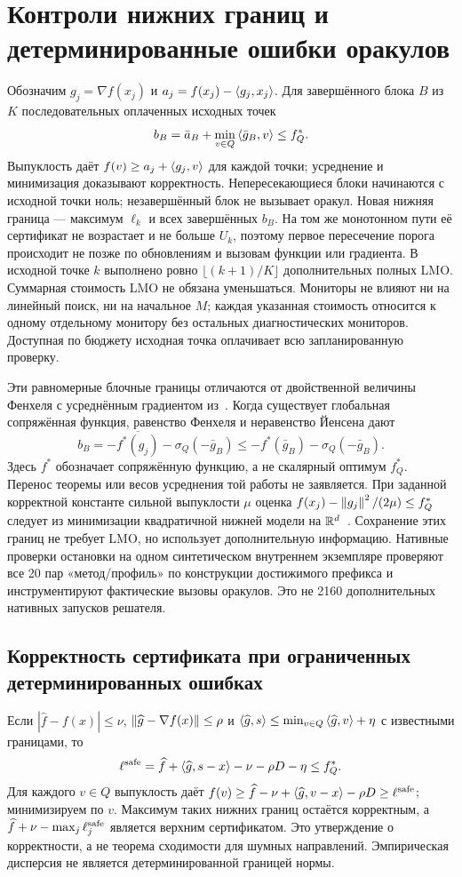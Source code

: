 \section{Контроли нижних границ и детерминированные ошибки оракулов}
\label{app:monitors}
Обозначим $g_j=\nabla f(x_j)$ и $a_j=f(x_j)-\left\langle g_j,x_j\right\rangle$.
Для завершённого блока $B$ из $K$ последовательных оплаченных
исходных точек
\[
 b_B=\bar a_B+\min_{v\in Q}\left\langle\bar g_B,v\right\rangle\le f_Q^*.
\]
Выпуклость даёт $f(v)\ge a_j+\left\langle g_j,v\right\rangle$ для каждой точки;
усреднение и минимизация доказывают корректность.
Непересекающиеся блоки начинаются с исходной точки ноль;
незавершённый блок не вызывает оракул. Новая нижняя граница —
максимум $\ell_k$ и всех завершённых $b_B$.
На том же монотонном пути её сертификат не возрастает и не больше
$U_k$, поэтому первое пересечение порога происходит не позже по
обновлениям и вызовам функции или градиента. В исходной точке $k$
выполнено ровно $\lfloor(k+1)/K\rfloor$ дополнительных полных LMO.
Суммарная стоимость LMO не обязана уменьшаться. Мониторы не влияют
ни на линейный поиск, ни на начальное $M$; каждая указанная стоимость
относится к одному отдельному монитору без остальных диагностических
мониторов. Доступная по бюджету исходная точка оплачивает всю
запланированную проверку.

Эти равномерные блочные границы отличаются от двойственной величины
Фенхеля с усреднённым градиентом из~\cite[теорема 3]{pedregosa}.
Когда существует глобальная сопряжённая функция, равенство Фенхеля
и неравенство Йенсена дают
\[
 b_B=-\overline{f^*(g_j)}-\sigma_Q(-\bar g_B)
     \le-f^*(\bar g_B)-\sigma_Q(-\bar g_B).
\]
Здесь $f^*$ обозначает сопряжённую функцию, а не скалярный оптимум
$f_Q^*$. Перенос теоремы или весов усреднения той работы не
заявляется. При заданной корректной константе сильной выпуклости
$\mu$ оценка $f(x_j)-\left\|g_j\right\|^2/(2\mu)\le f_Q^*$ следует из
минимизации квадратичной нижней модели на $\mathbb R^d$~\cite[приложение B]{karimi}.
Сохранение этих границ не требует LMO, но использует дополнительную
информацию. Нативные проверки остановки на одном синтетическом
внутреннем экземпляре проверяют все 20 пар «метод/профиль» по
конструкции достижимого префикса и инструментируют фактические
вызовы оракулов. Это не 2160 дополнительных нативных запусков решателя.

\subsection{Корректность сертификата при ограниченных детерминированных ошибках}
\label{app:inexact}
Если $|\widehat f-f(x)|\le\nu$,
$\left\|\widehat g-\nabla f(x)\right\|\le\rho$ и
$\left\langle\widehat g,s\right\rangle\le\min_{v\in Q}\left\langle\widehat g,v\right\rangle+\eta$
с известными границами, то
\[
 \ell^{\rm safe}=\widehat f+\left\langle\widehat g,s-x\right\rangle
                      -\nu-\rho D-\eta\le f_Q^*.
\]
Для каждого $v\in Q$ выпуклость даёт
$f(v)\ge\widehat f-\nu+\left\langle\widehat g,v-x\right\rangle-\rho D
\ge\ell^{\rm safe}$; минимизируем по $v$.
Максимум таких нижних границ остаётся корректным, а
$\widehat f+\nu-\max_j\ell_j^{\rm safe}$ является верхним
сертификатом. Это утверждение о корректности, а не теорема сходимости
для шумных направлений. Эмпирическая дисперсия не является
детерминированной границей нормы.

